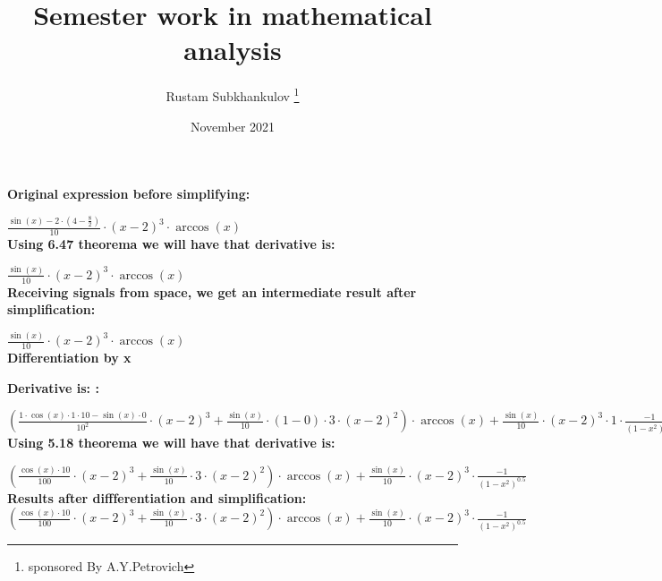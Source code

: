 \documentclass[a4paper, 12pt] {article}
\title{Semester work in mathematical analysis}
\author{Rustam Subkhankulov \thanks{sponsored By A.Y.Petrovich}}
\date{November 2021}
\begin{document}
 
\maketitle
\newpage



 \textbf{Original expression before simplifying:}

\begin{math}
 \frac {\sin(x)-2 \cdot (4- \frac {8}{2})}{10} \cdot (x-2)^3 \cdot \arccos(x)
\end{math} 
 \\ 




 \textbf{Using 6.47 theorema we will have that derivative is:}

\begin{math}
 \frac {\sin(x)}{10} \cdot (x-2)^3 \cdot \arccos(x)
\end{math} \\ 




 \textbf{Receiving signals from space, we get an intermediate result after simplification:}

\begin{math}
 \frac {\sin(x)}{10} \cdot (x-2)^3 \cdot \arccos(x)
\end{math} 
 \\ 


 \textbf{Differentiation by x}



 \textbf{Derivative is: :}

\begin{math}
( \frac {1 \cdot \cos(x) \cdot 1 \cdot 10-\sin(x) \cdot 0}{10^2} \cdot (x-2)^3+ \frac {\sin(x)}{10} \cdot (1-0) \cdot 3 \cdot (x-2)^2) \cdot \arccos(x)+ \frac {\sin(x)}{10} \cdot (x-2)^3 \cdot 1 \cdot  \frac {-1}{(1-x^2)^0.5}
\end{math} 
 \\ 




 \textbf{Using 5.18 theorema we will have that derivative is:}

\begin{math}
( \frac {\cos(x) \cdot 10}{100} \cdot (x-2)^3+ \frac {\sin(x)}{10} \cdot 3 \cdot (x-2)^2) \cdot \arccos(x)+ \frac {\sin(x)}{10} \cdot (x-2)^3 \cdot  \frac {-1}{(1-x^2)^0.5}
\end{math} \\ 



\textbf{Results after diffferentiation and simplification:}
 \begin{math}
( \frac {\cos(x) \cdot 10}{100} \cdot (x-2)^3+ \frac {\sin(x)}{10} \cdot 3 \cdot (x-2)^2) \cdot \arccos(x)+ \frac {\sin(x)}{10} \cdot (x-2)^3 \cdot  \frac {-1}{(1-x^2)^0.5}
 \end{math}
\end{document}
